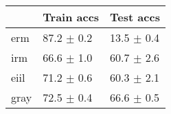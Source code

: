 \begin{tabular}{lll}
\toprule
{} &      Train accs &       Test accs \\
\midrule
erm  &  87.2 $\pm$ 0.2 &  13.5 $\pm$ 0.4 \\
irm  &  66.6 $\pm$ 1.0 &  60.7 $\pm$ 2.6 \\
eiil &  71.2 $\pm$ 0.6 &  60.3 $\pm$ 2.1 \\
gray &  72.5 $\pm$ 0.4 &  66.6 $\pm$ 0.5 \\
\bottomrule
\end{tabular}

